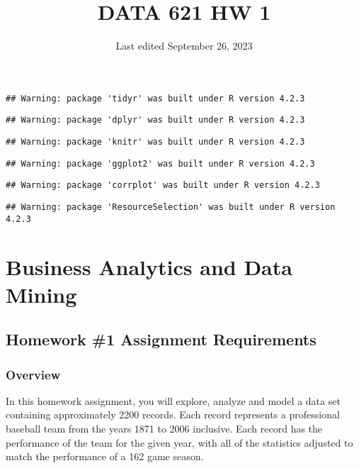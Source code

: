 \documentclass[
]{article}
\title{DATA 621 HW 1}
\author{}
\date{\vspace{-2.5em}Last edited September 26, 2023}
\begin{document}
\maketitle

\begin{verbatim}
## Warning: package 'tidyr' was built under R version 4.2.3
\end{verbatim}

\begin{verbatim}
## Warning: package 'dplyr' was built under R version 4.2.3
\end{verbatim}

\begin{verbatim}
## Warning: package 'knitr' was built under R version 4.2.3
\end{verbatim}

\begin{verbatim}
## Warning: package 'ggplot2' was built under R version 4.2.3
\end{verbatim}

\begin{verbatim}
## Warning: package 'corrplot' was built under R version 4.2.3
\end{verbatim}

\begin{verbatim}
## Warning: package 'ResourceSelection' was built under R version 4.2.3
\end{verbatim}

\hypertarget{business-analytics-and-data-mining}{%
\section{\texorpdfstring{\textbf{Business Analytics and Data
Mining}}{Business Analytics and Data Mining}}\label{business-analytics-and-data-mining}}

\hypertarget{homework-1-assignment-requirements}{%
\subsection{Homework \#1 Assignment
Requirements}\label{homework-1-assignment-requirements}}

\hypertarget{overview}{%
\subsubsection{\texorpdfstring{\textbf{Overview}}{Overview}}\label{overview}}

In this homework assignment, you will explore, analyze and model a data
set containing approximately 2200 records. Each record represents a
professional baseball team from the years 1871 to 2006 inclusive. Each
record has the performance of the team for the given year, with all of
the statistics adjusted to match the performance of a 162 game season.
\end{document}
